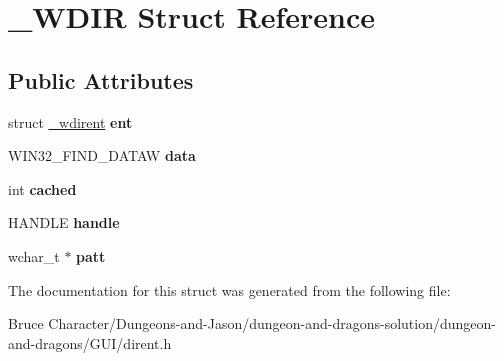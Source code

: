 \hypertarget{struct___w_d_i_r}{}\section{\+\_\+\+W\+D\+IR Struct Reference}
\label{struct___w_d_i_r}
\subsection*{Public Attributes}
\begin{DoxyCompactItemize}
\item 
\hypertarget{struct___w_d_i_r_a84ae1457352005f813ed4b3dc1994b62}{}\label{struct___w_d_i_r_a84ae1457352005f813ed4b3dc1994b62} 
struct \hyperlink{struct__wdirent}{\+\_\+wdirent} {\bfseries ent}
\item 
\hypertarget{struct___w_d_i_r_a065b17b666ee06c4e8068d8accb0eef9}{}\label{struct___w_d_i_r_a065b17b666ee06c4e8068d8accb0eef9} 
W\+I\+N32\+\_\+\+F\+I\+N\+D\+\_\+\+D\+A\+T\+AW {\bfseries data}
\item 
\hypertarget{struct___w_d_i_r_a9b7432df163d1e291ba5925347fd4af3}{}\label{struct___w_d_i_r_a9b7432df163d1e291ba5925347fd4af3} 
int {\bfseries cached}
\item 
\hypertarget{struct___w_d_i_r_a694510e166fd3e797b3e15b9e4b3810a}{}\label{struct___w_d_i_r_a694510e166fd3e797b3e15b9e4b3810a} 
H\+A\+N\+D\+LE {\bfseries handle}
\item 
\hypertarget{struct___w_d_i_r_a700ff3a1096fb36452c571b0f55b4e60}{}\label{struct___w_d_i_r_a700ff3a1096fb36452c571b0f55b4e60} 
wchar\+\_\+t $\ast$ {\bfseries patt}
\end{DoxyCompactItemize}


The documentation for this struct was generated from the following file\+:\begin{DoxyCompactItemize}
\item 
Bruce Character/\+Dungeons-\/and-\/\+Jason/dungeon-\/and-\/dragons-\/solution/dungeon-\/and-\/dragons/\+G\+U\+I/dirent.\+h\end{DoxyCompactItemize}
